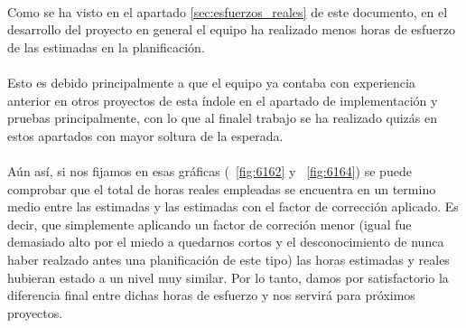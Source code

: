\paragraph{}Como se ha visto en el apartado \ref{sec:esfuerzos_reales} de este documento, en el desarrollo del proyecto en general el equipo ha realizado menos horas de esfuerzo de las estimadas en la planificación.

\paragraph{}Esto es debido principalmente a que el equipo ya contaba con experiencia anterior en otros proyectos de esta índole en el apartado de implementación y pruebas principalmente, con lo que al finalel trabajo se ha realizado quizás en estos apartados con mayor soltura de la esperada.

\paragraph{}Aún así, si nos fijamos en esas gráficas (~\cref{fig:6162} y ~\cref{fig:6164}) se puede comprobar que el total de horas reales empleadas se encuentra en un termino medio entre las estimadas y las estimadas con el factor de corrección aplicado. Es decir, que simplemente aplicando un factor de correción menor (igual fue demasiado alto por el miedo a quedarnos cortos y el desconocimiento de nunca haber realzado antes una planificación de este tipo) las horas estimadas y reales hubieran estado a un nivel muy similar. Por lo tanto, damos por satisfactorio la diferencia final entre dichas horas de esfuerzo y nos servirá para próximos proyectos.